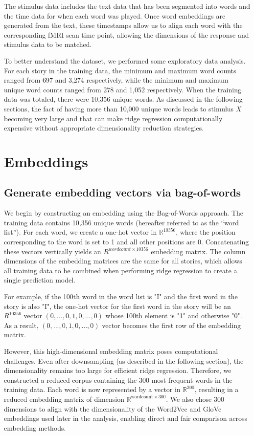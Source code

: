 \documentclass[12pt,letterpaper]{article}
\begin{document}
The stimulus data includes the text data that has been segmented into words and the time data for when each word was played. Once word embeddings are generated from the text, these timestamps allow us to align each word with the corresponding fMRI scan time point, allowing the dimensions of the response and stimulus data to be matched.

To better understand the dataset, we performed some exploratory data analysis. For each story in the training data, the minimum and maximum word counts ranged from 697 and 3,274 respectively, while the minimum and maximum unique word counts ranged from 278 and 1,052 respectively. When the training data was totaled, there were 10,356 unique words. As discussed in the following sections, the fact of having more than 10,000 unique words leads to stimulus $X$ becoming very large and that can make ridge regression computationally expensive without appropriate dimensionality reduction strategies.


\section{Embeddings}
\subsection{Generate embedding vectors via bag-of-words}
We begin by constructing an embedding using the Bag-of-Words approach. The training data contains 10,356 unique words (hereafter referred to as the “word list”). For each word, we create a one-hot vector in $\mathbb{R}^{10356}$, where the position corresponding to the word is set to 1 and all other positions are 0. Concatenating these vectors vertically yields an  $R^{wordcount \times 10356}$ embedding matrix. The column dimensions of the embedding matrices are the same for all stories, which allows all training data to be combined when performing ridge regression to create a single prediction model.

For example, if the 100th word in the word list is "I" and the first word in the story is also "I", the one-hot vector for the first word in the story will be an $R^{10356}$ vector $(0,...,0,1,0,...,0)$ whose 100th element is "1" and otherwise "0". As a result, $(0,...,0,1,0,...,0)$ vector becomes the first row of the embedding matrix.

However, this high-dimensional embedding matrix poses computational challenges. Even after downsampling (as described in the following section), the dimensionality remains too large for efficient ridge regression. Therefore, we constructed a reduced corpus containing the 300 most frequent words in the training data. Each word is now represented by a vector in $\mathbb{R}^{300}$, resulting in a reduced embedding matrix of dimension $\mathbb{R}^{\text{wordcount} \times 300}$. We also chose 300 dimensions to align with the dimensionality of the Word2Vec and GloVe embeddings used later in the analysis, enabling direct and fair comparison across embedding methods.
\end{document}
